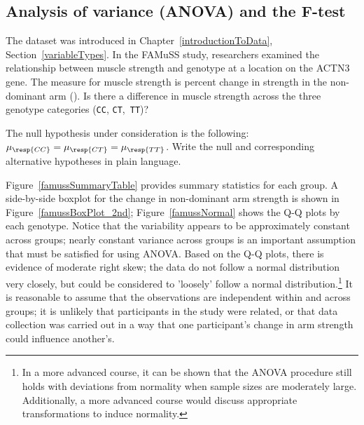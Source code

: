 \textD{\newpage}


\subsection{Analysis of variance (ANOVA) and the $\pmb{F}$-test}
\label{ANOVASection}

\noindent%
The  dataset was introduced in Chapter~\ref{introductionToData}, Section~\ref{variableTypes}. In the FAMuSS study, researchers examined the relationship between muscle strength and genotype at a location on the ACTN3 gene. The measure for muscle strength is percent change in strength in the non-dominant arm (). Is there a difference in muscle strength across the three genotype categories (\texttt{CC}, \texttt{CT},~\texttt{TT})?

\begin{exercisewrap}
\begin{nexercise}\label{nullHypForFamuss}%
The null hypothesis under consideration is the following: $\mu_{\resp{CC}} = \mu_{\resp{CT}} = \mu_{\resp{TT}}$.
Write the null and corresponding alternative hypotheses in plain language.\footnotemark{}
\end{nexercise}
\end{exercisewrap}

Figure~\ref{famussSummaryTable} provides summary statistics for each group. A side-by-side boxplot for the change in non-dominant arm strength is shown in Figure~\ref{famussBoxPlot_2nd}; Figure~\ref{famussNormal} shows the Q-Q plots by each genotype. Notice that the variability appears to be approximately constant across groups; nearly constant variance across groups is an important assumption that must be satisfied for using ANOVA. Based on the Q-Q plots, there is evidence of moderate right skew; the data do not follow a normal distribution very closely, but could be considered to 'loosely' follow a normal distribution.\footnote{In a more advanced course, it can be shown that the ANOVA procedure still holds with deviations from normality when sample sizes are moderately large. Additionally, a more advanced course would discuss appropriate transformations to induce normality.} It is reasonable to assume that the observations are independent within and across groups; it is unlikely that participants in the study were related, or that data collection was carried out in a way that one participant's change in arm strength could influence another's. 

